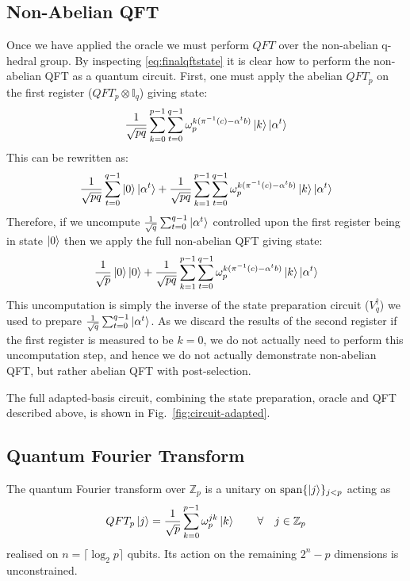 \documentclass[aps,floatfix,10pt,amssymb,amsfont,amsmath,superscriptaddress,float,nofootinbib,longbibliography,nobalancelastpage,twocolumn]{revtex4-2}
\begin{document}
\subsection{Non-Abelian QFT}
Once we have applied the oracle we must perform $QFT$ over the non-abelian q-hedral group. By inspecting \eqref{eq:finalqftstate} it is clear how to perform the non-abelian QFT as a quantum circuit. First, one must apply the abelian $QFT_p$ on the first register ($QFT_p \otimes \mathbb{I}_q$) giving state:
\begin{equation}
    \frac{1}{\sqrt{pq}} \sum_{k=0}^{p-1}\sum_{t = 0}^{q-1} \omega_p^{k (\pi^{-1}(c) - \alpha^tb)}\ket{k}\ket{\alpha^t}
\end{equation}
This can be rewritten as:
\begin{equation}
  \frac{1}{\sqrt{pq}}\sum_{t=0}^{q-1} \ket{0}\ket{\alpha^t}+ \frac{1}{\sqrt{pq}} \sum_{k=1}^{p-1}\sum_{t = 0}^{q-1} \omega_p^{k (\pi^{-1}(c) - \alpha^tb)}\ket{k}\ket{\alpha^t}
\end{equation}
Therefore, if we uncompute $\frac{1}{\sqrt{q}}\sum_{t=0}^{q-1}\ket{\alpha^t}$ controlled upon the first register being in state $\ket{0}$ then we apply the full non-abelian QFT giving state:
\begin{equation}
  \frac{1}{\sqrt{p}} \ket{0}\ket{0} +\frac{1}{\sqrt{pq}} \sum_{k=1}^{p-1}\sum_{t = 0}^{q-1} \omega_p^{k (\pi^{-1}(c) - \alpha^tb)}\ket{k}\ket{\alpha^t}
\end{equation}
This uncomputation is simply the inverse of the state preparation circuit ($V_q^{\dagger}$) we used to prepare $\frac{1}{\sqrt{q}}\sum_{t=0}^{q-1}\ket{\alpha^t}$. As we discard the results of the second register if the first register is measured to be $k=0$, we do not actually need to perform this uncomputation step, and hence we do not actually demonstrate non-abelian QFT, but rather abelian QFT with post-selection. 

The full adapted-basis circuit, combining the state preparation, oracle and QFT described above, is shown in Fig.~\ref{fig:circuit-adapted}.

\subsection{Quantum Fourier Transform}

The quantum Fourier transform over $\mathbb{Z}_p$
is a unitary on $\mathrm{span}\{\ket{j}\}_{j<p}$ acting as
\begin{equation}
    QFT_p \ket{j} = \frac{1}{\sqrt{p}}\sum_{k=0}^{p-1} \omega_p^{jk} \ket{k} \qquad \forall \quad  j \in \mathbb{Z}_p
\end{equation}
realised on $n=\lceil\log_2 p\rceil$ qubits. Its action on the remaining $2^n-p$ dimensions is unconstrained.
\end{document}
